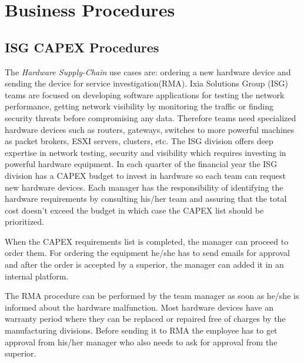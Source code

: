 \chapter{Business Procedures}
\label{chapter:chapter4}

\section{ISG CAPEX Procedures}
\label{sub-sec:chapter4-section1}
The \emph{Hardware Supply-Chain} use cases are: ordering a new hardware device and sending the device for service investigation(RMA).
Ixia Solutions Group (ISG) teams are focused on developing software applications for testing the network performance, getting network visibility by monitoring the traffic or finding security threats before compromising any data.
Therefore teams need specialized hardware devices such as routers, gateways, switches to more powerful machines as packet brokers, ESXI servers, clusters, etc.
The ISG division offers deep expertise in network testing, security and visibility which requires investing in powerful hardware equipment.
In each quarter of the financial year the ISG division has a CAPEX budget to invest in hardware so each team can request new hardware devices.
Each manager has the responsibility of identifying the hardware requirements by consulting his/her team and assuring that the total cost doesn't exceed the budget in which case the CAPEX list should be prioritized.

When the CAPEX requirements list is completed, the manager can proceed to order them.
For ordering the equipment he/she has to send emails for approval and after the order is accepted by a superior, the manager can added it in an internal platform.

The RMA procedure can be performed by the team manager as soon as he/she is informed about the hardware malfunction. Most hardware devices have an warranty period where they can be replaced or repaired free of charges by the manufacturing divisions. Before sending it to RMA the employee has to get approval from his/her manager who also needs to ask for approval from the superior.

